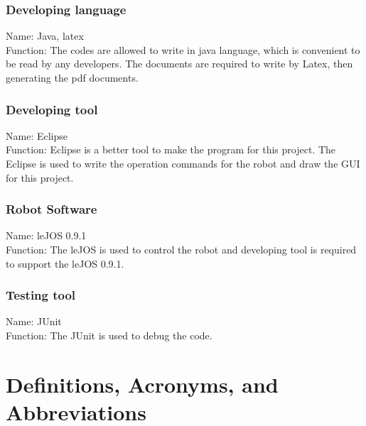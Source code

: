 \documentclass[11pt, a4paper]{report}
\begin{document}
\subsection{Developing language}
Name: Java, latex\\
Function: The codes are allowed to write in java language, which is convenient to be read by any developers. The documents are required to write by Latex, then generating the pdf documents.
\subsection{Developing tool}
Name: Eclipse\\
Function: Eclipse is a better tool to make the program for this project. The Eclipse is used to write the operation commands for the robot and draw the GUI for this project.
\subsection{Robot Software}
Name: leJOS 0.9.1\\
 Function: The leJOS is used to control the robot and developing tool is required to support the leJOS 0.9.1. 
 \subsection{Testing tool}
 Name: JUnit\\
 Function: The JUnit is used to debug the code.

\pagebreak

\chapter{Definitions, Acronyms, and Abbreviations} %
\label{cha:DAA}
\end{document}
